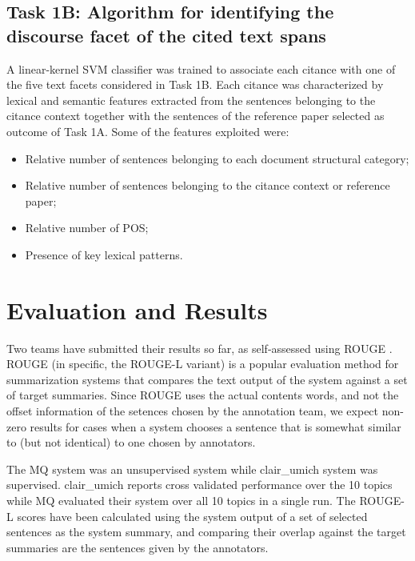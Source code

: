 \documentclass[11pt]{article}
\begin{document}
\subsection{Task 1B: Algorithm for identifying the discourse facet of the 
											cited text spans}
A linear-kernel SVM classifier was trained to associate each citance with one
 of the five text facets considered in Task 1B. Each citance was characterized 
 by lexical and semantic features extracted from the sentences belonging to 
 the citance context together with the sentences of the reference paper 
 selected as outcome of Task 1A.   Some of the features exploited were:
\begin{itemize}
\item{Relative number of sentences belonging to each document
  structural category;}
\vspace{-.3cm}
\item{Relative number of sentences belonging to the citance context or
  reference paper;}
\vspace{-.3cm}
\item{Relative number of POS;}
\vspace{-.3cm}
\item{Presence of key lexical patterns.}
\end{itemize}

\section{Evaluation and Results}
Two teams have submitted their results so far, as self-assessed using
ROUGE \cite{Lin:2004}. ROUGE (in specific, the ROUGE-L variant) is a
popular evaluation method for summarization systems that compares the
text output of the system against a set of target summaries. Since
ROUGE uses the actual contents words, and not the offset information
of the setences chosen by the annotation team, we expect non-zero
results for cases when a system chooses a sentence that is somewhat
similar to (but not identical) to one chosen by annotators.

The MQ system was an unsupervised system while clair\_umich system was
supervised. clair\_umich reports cross validated performance over the
10 topics while MQ evaluated their system over all 10 topics in a
single run.   
The ROUGE-L scores have been calculated using the system output
of a set of selected sentences as the system summary, and comparing their overlap
against the target summaries are the sentences given by the
annotators. 
\end{document}

